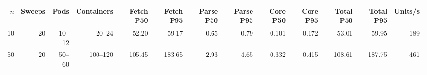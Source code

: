 \begin{tabular}{@{}rrrrrrrrrrrrr@{}}
\toprule
$n$ & Sweeps & Pods & Containers & Fetch P50 & Fetch P95 & Parse P50 & Parse P95 & Core P50 & Core P95 & Total P50 & Total P95 & Units/s \\
\midrule
10 & 20 & 10--12 & 20--24 & 52.20 & 59.17 & 0.65 & 0.79 & 0.101 & 0.172 & 53.01 & 59.95 & 189 \\
50 & 20 & 50--60 & 100--120 & 105.45 & 183.65 & 2.93 & 4.65 & 0.332 & 0.415 & 108.61 & 187.75 & 461 \\
\bottomrule
\end{tabular}

